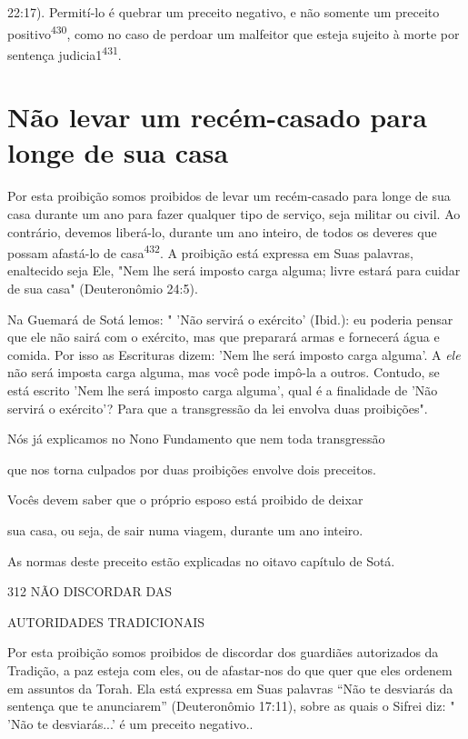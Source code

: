 22:17). Permití-lo é quebrar um preceito negativo, e não somente um
preceito positivo\textsuperscript{430}, como no caso de perdoar um
malfeitor que esteja sujeito à morte por sentença
judicia1\textsuperscript{431}.

\section{Não levar um recém-casado para longe de sua casa}

Por esta proibição somos proibidos de levar um recém-casado para longe
de sua casa durante um ano para fazer qualquer tipo de serviço, seja
mili­tar ou civil. Ao contrário, devemos liberá-lo, durante um ano
inteiro, de todos os deveres que possam afastá-lo de
casa\textsuperscript{432}. A proibição está expressa em Suas palavras,
enaltecido seja Ele, "Nem lhe será imposto carga alguma; livre estará
para cuidar de sua casa" (Deuteronômio 24:5).

Na Guemará de Sotá lemos: " 'Não servirá o exército' (Ibid.): eu
po­deria pensar que ele não sairá com o exército, mas que preparará
armas e for­necerá água e comida. Por isso as Escrituras dizem: 'Nem lhe
será imposto car­ga alguma'. A \emph{ele} não será imposta carga alguma,
mas você pode impô-la a ou­tros. Contudo, se está escrito 'Nem lhe será
imposto carga alguma', qual é a finalidade de 'Não servirá o exército'?
Para que a transgressão da lei envolva duas proibições".


Nós já explicamos no Nono Fundamento que nem toda transgressão


que nos torna culpados por duas proibições envolve dois preceitos.


Vocês devem saber que o próprio esposo está proibido de deixar


sua casa, ou seja, de sair numa viagem, durante um ano inteiro.


As normas deste preceito estão explicadas no oitavo capítulo de Sotá.


312 NÃO DISCORDAR DAS

AUTORIDADES TRADICIONAIS

Por esta proibição somos proibidos de discordar dos guardiães
au­torizados da Tradição, a paz esteja com eles, ou de afastar-nos do
que quer que eles ordenem em assuntos da Torah. Ela está expressa em
Suas palavras ``Não te desviarás da sentença que te anunciarem''
(Deuteronômio 17:11), sobre as quais o Sifrei diz: " 'Não te
desviarás...' é um preceito negativo..


